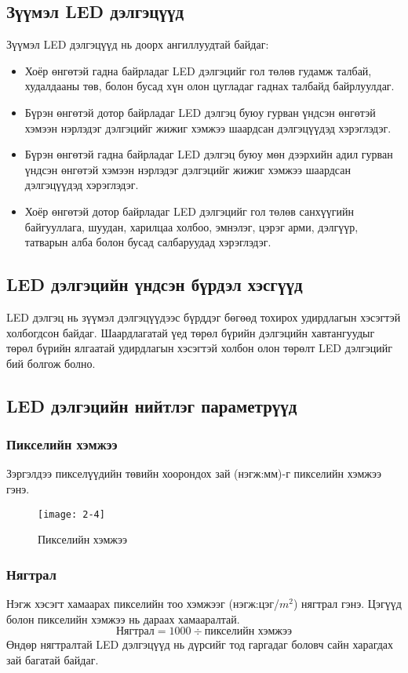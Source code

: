 \subsection{Зүүмэл LED дэлгэцүүд}
Зүүмэл LED дэлгэцүүд нь доорх ангиллуудтай байдаг:
\begin{itemize}
	\item Хоёр өнгөтэй гадна байрладаг LED дэлгэцийг гол төлөв гудамж талбай, худалдааны төв, болон бусад хүн олон цугладаг гаднах талбайд байрлуулдаг.                                            
	\item Бүрэн өнгөтэй дотор байрладаг LED дэлгэц буюу гурван үндсэн өнгөтэй хэмээн нэрлэдэг дэлгэцийг жижиг хэмжээ шаардсан дэлгэцүүдэд хэрэглэдэг. 
	\item Бүрэн өнгөтэй гадна байрладаг LED дэлгэц буюу мөн дээрхийн адил гурван үндсэн өнгөтэй хэмээн нэрлэдэг дэлгэцийг жижиг хэмжээ шаардсан дэлгэцүүдэд хэрэглэдэг. 
	\item Хоёр өнгөтэй дотор байрладаг LED дэлгэцийг гол төлөв санхүүгийн байгууллага, шуудан, харилцаа холбоо, эмнэлэг, цэрэг арми, дэлгүүр, татварын алба болон бусад салбаруудад хэрэглэдэг. 
\end{itemize}

\subsection{LED дэлгэцийн үндсэн бүрдэл хэсгүүд}
LED дэлгэц нь зүүмэл дэлгэцүүдээс бүрддэг бөгөөд тохирох удирдлагын хэсэгтэй холбогдсон байдаг. Шаардлагатай үед төрөл бүрийн дэлгэцийн хавтангуудыг төрөл бүрийн ялгаатай удирдлагын хэсэгтэй холбон олон төрөлт LED дэлгэцийг бий болгож болно.
\subsection{LED дэлгэцийн нийтлэг параметрүүд}
\subsubsection{Пикселийн хэмжээ } 
Зэргэлдээ пикселүүдийн төвийн хоорондох зай (нэгж:мм)-г пикселийн хэмжээ гэнэ. 
\begin{figure}[!ht]
	\centering
	\texttt{[image: 2-4]}
	\caption{Пикселийн хэмжээ}
	\label{fig:2-2}
\end{figure}
\subsubsection{Нягтрал }
Нэгж хэсэгт хамаарах пикселийн тоо хэмжээг (нэгж:цэг/$m^2$) нягтрал гэнэ. 
Цэгүүд болон пикселийн хэмжээ нь дараах хамааралтай. 
\[\textit{Нягтрал}=1000\div \textit{пикселийн хэмжээ}\] 
Өндөр нягтралтай LED дэлгэцүүд нь дүрсийг тод гаргадаг боловч сайн харагдах зай багатай байдаг.
